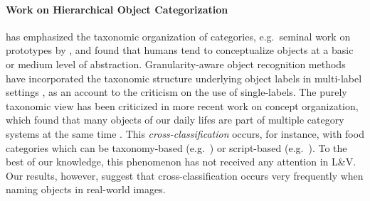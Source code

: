 \paragraph{Work on Hierarchical Object Categorization} 
has emphasized the taxonomic organization of categories, e.g.\ seminal work on prototypes by ,  and found that humans tend to conceptualize objects at a basic or medium level of abstraction.
Granularity-aware object recognition methods have incorporated the taxonomic structure underlying object labels in multi-label settings \cite{deng2014large,wang2014poodle,peterson2018learning}, as an account to the criticism on the use of single-labels. 
The purely taxonomic view has been criticized in more recent work on concept organization, which found that many objects of our daily lifes are part of multiple category systems at the same time \cite{ross1999food, where }. 
This \textit{cross-classification} occurs, for instance, with food categories which can be taxonomy-based (e.g.\  ) or script-based (e.g.\  ).
To the best of our knowledge, this phenomenon has not received any attention in L\&V.
Our results, however, suggest that cross-classification occurs very frequently when naming objects in real-world images.
%
